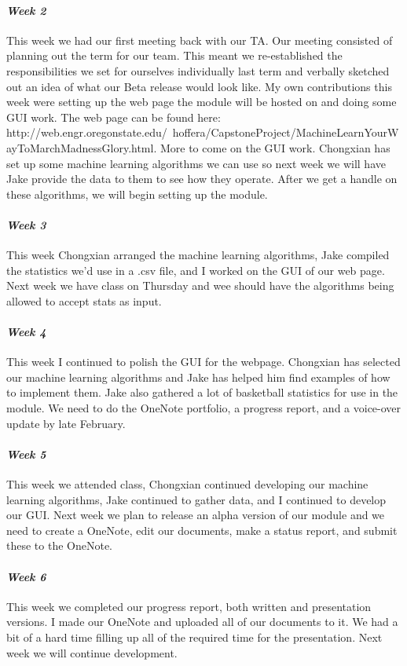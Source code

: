 \documentclass[onecolumn, draftclsnofoot,10pt, compsoc]{IEEEtran}
\begin{document}
\paragraph{\emph{Week 2}}
This week we had our first meeting back with our TA. Our meeting consisted of planning out the term for our team. This meant we re-established the responsibilities we set for ourselves individually last term and verbally sketched out an idea of what our Beta release would look like. My own contributions this week were setting up the web page the module will be hosted on and doing some GUI work. The web page can be found here: http://web.engr.oregonstate.edu/~hoffera/CapstoneProject/MachineLearnYourWayToMarchMadnessGlory.html. More to come on the GUI work. Chongxian has set up some machine learning algorithms we can use so next week we will have Jake provide the data to them to see how they operate. After we get a handle on these algorithms, we will begin setting up the module.
\paragraph{\emph{Week 3}}
This week Chongxian arranged the machine learning algorithms, Jake compiled the statistics we'd use in a .csv file, and I worked on the GUI of our web page. Next week we have class on Thursday and wee should have the algorithms being allowed to accept stats as input.
\paragraph{\emph{Week 4}}
This week I continued to polish the GUI for the webpage. Chongxian has selected our machine learning algorithms and Jake has helped him find examples of how to implement them. Jake also gathered a lot of basketball statistics for use in the module. We need to do the OneNote portfolio, a progress report, and a voice-over update by late February.
\paragraph{\emph{Week 5}}
This week we attended class, Chongxian continued developing our machine learning algorithms, Jake continued to gather data, and I continued to develop our GUI. Next week we plan to release an alpha version of our module and we need to create a OneNote, edit our documents, make a status report, and submit these to the OneNote.
\paragraph{\emph{Week 6}}
This week we completed our progress report, both written and presentation versions. I made our OneNote and uploaded all of our documents to it. We had a bit of a hard time filling up all of the required time for the presentation. Next week we will continue development.
\end{document}
